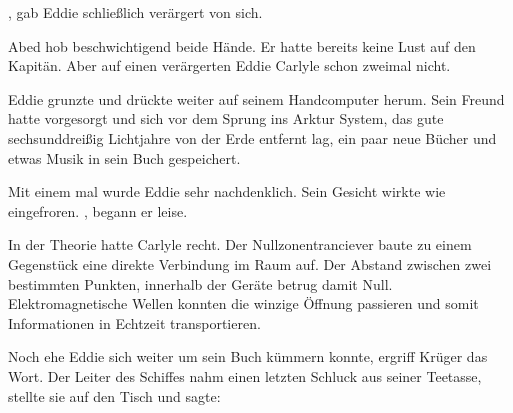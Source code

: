 , gab Eddie schließlich verärgert von sich. 

\par

Abed hob beschwichtigend beide Hände. Er hatte bereits keine Lust auf den Kapitän. Aber auf einen verärgerten Eddie Carlyle schon zweimal nicht. 

\par

Eddie grunzte und drückte weiter auf seinem Handcomputer herum. Sein Freund hatte vorgesorgt und sich vor dem Sprung ins Arktur System, das gute sechsunddreißig Lichtjahre von der Erde entfernt lag, ein paar neue Bücher und etwas Musik in sein Buch gespeichert.

\par

Mit einem mal wurde Eddie sehr nachdenklich. Sein Gesicht wirkte wie eingefroren. , begann er leise. 

\par

In der Theorie hatte Carlyle recht. Der Nullzonentranciever baute zu einem Gegenstück eine direkte Verbindung im Raum auf. Der Abstand zwischen zwei bestimmten Punkten, innerhalb der Geräte betrug damit Null. Elektromagnetische Wellen konnten die winzige Öffnung passieren und somit Informationen in Echtzeit transportieren.

\par

Noch ehe Eddie sich weiter um sein Buch kümmern konnte, ergriff Krüger das Wort. Der Leiter des Schiffes nahm einen letzten Schluck aus seiner Teetasse, stellte sie auf den Tisch und sagte: 

\par

